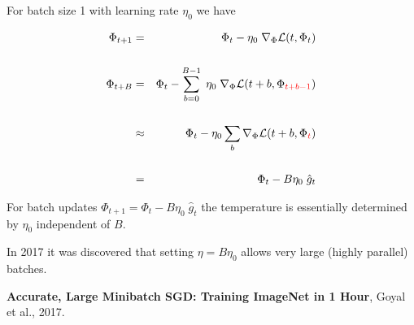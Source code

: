 {For batch size 1 with learning rate $\eta_0$ we have

\begin{eqnarray*}
\Phi_{t+1} & = &  \Phi_{t} - \eta_0\;\nabla_\Phi {\cal L}(t,\Phi_{t}) \\
\\
\Phi_{t+B} & = &  \Phi_{t} - \sum_{b=0}^{B-1} \;\eta_0\;\nabla_\Phi {\cal L}(t+b,\Phi_{\color{red} t+b-1}) \\
\\
& \approx & \Phi_t - \eta_0 \sum_b \nabla_\Phi {\cal L}(t+b,\Phi_{\color{red} t}) \\
\\
& = & \Phi_t - B\eta_0\; \hat{g}_t
\end{eqnarray*}

\vfill
For batch updates $\Phi_{t+1} = \Phi_t - B\eta_0\; \hat{g}_t$ the temperature is essentially determined by $\eta_0$ independent of $B$.


In 2017 it was discovered that setting $\eta = B\eta_0$ allows very large (highly parallel)
batches.

\vfill
{\bf Accurate, Large Minibatch SGD: Training ImageNet in 1 Hour}, Goyal et al., 2017.


} 

